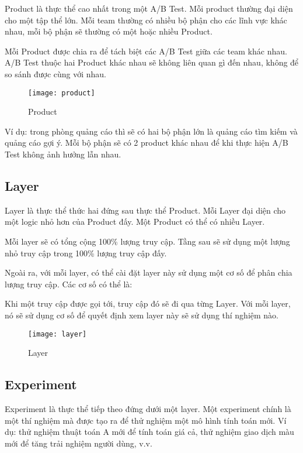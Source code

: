 Product là thực thể cao nhất trong một A/B Test. Mỗi product thường đại diện cho một tập thể lớn. Mỗi team thường có nhiều bộ phận cho các lĩnh vực khác nhau, mỗi bộ phận sẽ thường có một hoặc nhiều Product.

Mỗi Product được chia ra để tách biệt các A/B Test giữa các team khác nhau. A/B Test thuộc hai Product khác nhau sẽ không liên quan gì đến nhau, không để so sánh được cùng với nhau.

\begin{figure}[H]
	\centering
	\texttt{[image: product]}
	\caption{Product}
\end{figure}

Ví dụ: trong phòng quảng cáo thì sẽ có hai bộ phận lớn là quảng cáo tìm kiếm và quảng cáo gợi ý. Mỗi bộ phận sẽ có 2 product khác nhau để khi thực hiện A/B Test không ảnh hưởng lẫn nhau.

\subsection{Layer}

Layer là thực thể thức hai đứng sau thực thể Product. Mỗi Layer đại diện cho một logic nhỏ hơn của Product đấy. Một Product có thể có nhiều Layer.

Mỗi layer sẽ có tổng cộng 100\% lượng truy cập. Tầng sau sẽ sử dụng một lượng nhỏ truy cập trong 100\% lượng truy cập đấy.

Ngoài ra, với mỗi layer, có thể cài đặt layer này sử dụng một cơ số để phân chia lượng truy cập. Các cơ số có thể là:

\begin{itemize}
\end{itemize}

Khi một truy cập được gọi tới, truy cập đó sẽ đi qua từng Layer. Với mỗi layer, nó sẽ sử dụng cơ số để quyết định xem layer này sẽ sử dụng thí nghiệm nào.

\begin{figure}[H]
	\centering
	\texttt{[image: layer]}
	\caption{Layer}
\end{figure}

\subsection{Experiment}

Experiment là thực thể tiếp theo đứng dưới một layer. Một experiment chính là một thí nghiệm mà được tạo ra để thử nghiệm một mô hình tính toán mới. Ví dụ: thử nghiệm thuật toán A mới để tính toán giá cả, thử nghiệm giao dịch màu mới để tăng trải nghiệm người dùng, v.v.

